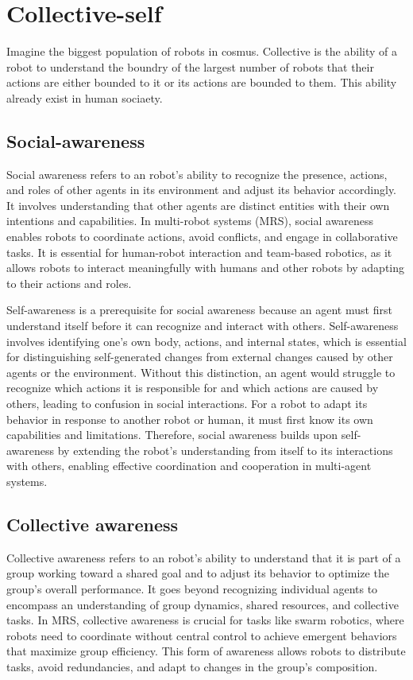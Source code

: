 \chapter{Collective-self}
Imagine the biggest population of robots in cosmus. Collective is the ability of a robot to understand the boundry of the largest number of robots that their actions are either bounded to it or its actions are bounded to them. This ability already exist in human sociaety.
\section{Social-awareness}
    Social awareness refers to an robot's ability to recognize the presence, actions, and roles of other agents in its environment and adjust its behavior accordingly. It involves understanding that other agents are distinct entities with their own intentions and capabilities. In multi-robot systems (MRS), social awareness enables robots to coordinate actions, avoid conflicts, and engage in collaborative tasks. It is essential for human-robot interaction and team-based robotics, as it allows robots to interact meaningfully with humans and other robots by adapting to their actions and roles. \cite{fong-2003-socially-interactive-robots-survey}

    Self-awareness is a prerequisite for social awareness because an agent must first understand itself before it can recognize and interact with others. Self-awareness involves identifying one’s own body, actions, and internal states, which is essential for distinguishing self-generated changes from external changes caused by other agents or the environment. Without this distinction, an agent would struggle to recognize which actions it is responsible for and which actions are caused by others, leading to confusion in social interactions. For a robot to adapt its behavior in response to another robot or human, it must first know its own capabilities and limitations. Therefore, social awareness builds upon self-awareness by extending the robot’s understanding from itself to its interactions with others, enabling effective coordination and cooperation in multi-agent systems.
    \cite{groom-2007-self-awareness-in-human-robot-interaction}
\section{Collective awareness}
    Collective awareness refers to an robot's ability to understand that it is part of a group working toward a shared goal and to adjust its behavior to optimize the group's overall performance. It goes beyond recognizing individual agents to encompass an understanding of group dynamics, shared resources, and collective tasks. In MRS, collective awareness is crucial for tasks like swarm robotics, where robots need to coordinate without central control to achieve emergent behaviors that maximize group efficiency. This form of awareness allows robots to distribute tasks, avoid redundancies, and adapt to changes in the group’s composition. \cite{brambilla-2013-swarm-robotics-review}
    

